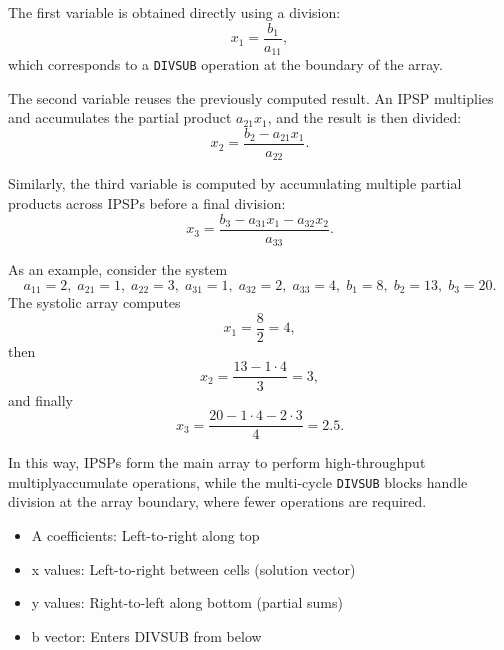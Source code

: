 \documentclass[a4paper,12pt]{article}
\begin{document}
The first variable is obtained directly using a division:
\begin{equation}
x_1 = \frac{b_1}{a_{11}},
\end{equation}
which corresponds to a \texttt{DIVSUB} operation at the boundary of the array.

The second variable reuses the previously computed result. An IPSP multiplies and accumulates the partial product $a_{21}x_1$, and the result is then divided:
\begin{equation}
x_2 = \frac{b_2 - a_{21}x_1}{a_{22}}.
\end{equation}

Similarly, the third variable is computed by accumulating multiple partial products across IPSPs before a final division:
\begin{equation}
x_3 = \frac{b_3 - a_{31}x_1 - a_{32}x_2}{a_{33}}.
\end{equation}

As an example, consider the system
\[
a_{11}=2,\; a_{21}=1,\; a_{22}=3,\; a_{31}=1,\; a_{32}=2,\; a_{33}=4,\;
b_1=8,\; b_2=13,\; b_3=20.
\]
The systolic array computes
\[
x_1 = \frac{8}{2} = 4,
\]
then
\[
x_2 = \frac{13 - 1\cdot 4}{3} = 3,
\]
and finally
\[
x_3 = \frac{20 - 1\cdot 4 - 2\cdot 3}{4} = 2.5.
\]

In this way, IPSPs form the main array to perform high-throughput multiply\-accumulate operations, while the multi-cycle \texttt{DIVSUB} blocks handle division at the array boundary, where fewer operations are required.

\begin{itemize}
    \item A coefficients: Left-to-right along top
    \item x values: Left-to-right between cells (solution vector)
    \item y values: Right-to-left along bottom (partial sums)
    \item b vector: Enters DIVSUB from below
\end{itemize}
\end{document}

